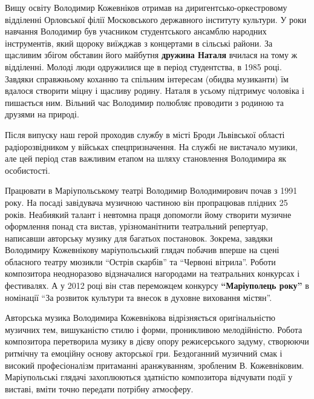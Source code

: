 
Вищу освіту Володимир Кожевніков отримав на диригентсько-оркестровому
відділенні Орловської філії Московського державного інституту культури. У роки
навчання Володимир був учасником студентського ансамблю народних інструментів,
який щороку виїжджав з концертами в сільські райони. За щасливим збігом
обставин його майбутня \textbf{дружина Наталя} вчилася на тому ж відділенні. Молоді люди
одружилися ще в період студентства, в 1985 році. Завдяки справжньому коханню та
спільним інтересам (обидва музиканти) їм вдалося створити міцну і щасливу
родину. Наталя в усьому підтримує чоловіка і пишається ним. Вільний час
Володимир полюбляє проводити з родиною та друзями на природі.


Після випуску наш герой проходив службу в місті Броди Львівської області
радіорозвідником у військах спецпризначення. На службі не вистачало музики, але
цей період став важливим етапом на шляху становлення Володимира як особистості.


Працювати в Маріупольському театрі Володимир Володимирович почав з 1991 року.
На посаді завідувача музичною частиною він пропрацював плідних 25 років.
Неабиякий талант і невтомна праця допомогли йому створити музичне оформлення
понад ста вистав, урізноманітнити театральний репертуар, написавши авторську
музику для багатьох постановок. Зокрема, завдяки Володимиру Кожевнікову
маріупольський глядач побачив вперше на сцені обласного театру мюзикли \enquote{Острів
скарбів} та \enquote{Червоні вітрила}. Роботи композитора неодноразово відзначалися
нагородами на театральних конкурсах і фестивалях. А у 2012 році він став
переможцем конкурсу \textbf{\enquote{Маріуполець року}} в номінації \enquote{За розвиток культури та
внесок в духовне виховання містян}.


Авторська музика Володимира Кожевнікова відрізняється оригінальністю музичних
тем, вишуканістю стилю і форми, проникливою мелодійністю. Робота композитора
перетворила музику в дієву опору режисерського задуму, створюючи ритмічну та
емоційну основу акторської гри. Бездоганний музичний смак і високий
професіоналізм притаманні аранжуванням, зробленим В. Кожевніковим.
Маріупольські глядачі захоплюються здатністю композитора відчувати події у
виставі, вміти точно передати потрібну атмосферу.

